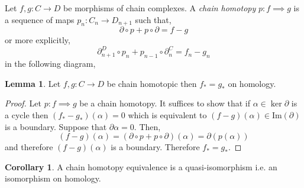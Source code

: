 \documentclass[12pt]{article}
\renewcommand{\Im}[1]{\mathrm{Im}(#1)}
\theoremstyle{remark}
\theoremstyle{definition}
\newtheorem{lemma}[theorem]{Lemma}
\newtheorem{corollary}[theorem]{Corollary}
\newenvironment{definition}[1][Definition:]{\begin{trivlist}
\item[\hskip \labelsep {\bfseries #1}]}{\end{trivlist}}
\begin{document}
\begin{definition}
Let $f, g : C \to D$ be morphisms of chain complexes. A \textit{chain homotopy} $p : f \implies g$ is a sequence of maps $p_n : C_n \to D_{n+1}$ such that, 
\[ \partial \circ p + p \circ \partial = f - g \]
or more explicitly,
\[ 
\partial^D_{n+1} \circ p_n + p_{n-1} \circ \partial^C_{n} = f_n - g_n \] 
in the following diagram,
\begin{center}
\end{center}
\end{definition}

\begin{lemma}
Let $f,g : C \to D$ be chain homotopic then $f_* = g_*$ on homology.
\end{lemma}

\begin{proof}
Let $p : f \implies g$ be a chain homotopy. It suffices to show that if $\alpha \in \ker{\partial}$ is a cycle then $(f_* - g_*)(\alpha) = 0$ which is equivalent to $(f - g)(\alpha) \in \Im{\partial}$ is a boundary. Suppose that $\partial \alpha = 0$. Then, 
\[ (f - g)(\alpha) = (\partial \circ p + p \circ \partial)(\alpha) = \partial(p(\alpha)) \]
and therefore $(f - g)(\alpha)$ is a boundary. Therefore $f_* = g_*$. 
\end{proof}

\begin{corollary}
A chain homotopy equivalence is a quasi-isomorphism i.e. an isomorphism on homology.
\end{corollary}
\end{document}
